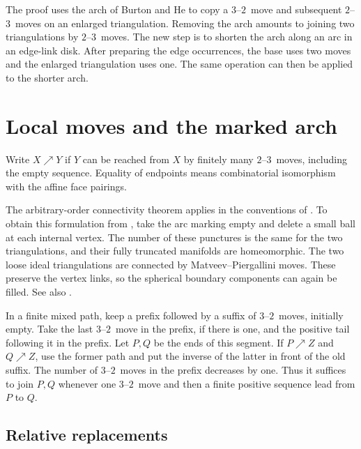 \documentclass[11pt]{amsart}
\newcommand{\up}{\mathrel{\nearrow}}
\newcommand{\moveup}{\(2\)--\(3\)}
\newcommand{\movedown}{\(3\)--\(2\)}
\begin{document}
The proof uses the arch of Burton and He to copy a \movedown\ move and
subsequent \moveup\ moves on an enlarged triangulation. Removing the arch
amounts to joining two triangulations by \moveup\ moves. The new step is to
shorten the arch along an arc in an edge-link disk. After preparing the edge
occurrences, the base uses two moves and the enlarged triangulation uses one.
The same operation can then be applied to the shorter arch.

\section{Local moves and the marked arch}\label{sec:arch}

Write \(X\up Y\) if \(Y\) can be reached from \(X\) by finitely many
\moveup\ moves, including the empty sequence. Equality of endpoints means
combinatorial isomorphism with the affine face pairings.

The arbitrary-order connectivity theorem applies in the conventions of
\cite[Notation~6 and Theorem~7]{bh}. To obtain this formulation from
\cite[Corollary~2.2]{amendola}, take the arc marking empty and delete a small
ball at each internal vertex. The number of these punctures is the same for
the two triangulations, and their fully truncated manifolds are
homeomorphic. The two loose ideal triangulations are connected by
Matveev--Piergallini moves. These preserve the vertex links, so the spherical
boundary components can again be filled. See also \cite[Theorem~1.4]{rst}.

In a finite mixed path, keep a prefix followed by a suffix of \movedown\
moves, initially empty. Take the last \movedown\ move in the prefix, if
there is one, and the positive tail following it in the prefix. Let \(P,Q\)
be the ends of this segment. If \(P\up Z\) and \(Q\up Z\), use the former
path and put the inverse of the latter in front of the old suffix. The
number of \movedown\ moves in the prefix decreases by one. Thus it suffices
to join \(P,Q\) whenever one \movedown\ move and then a finite positive
sequence lead from \(P\) to \(Q\).

\subsection{Relative replacements}
\end{document}
